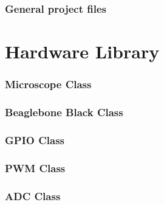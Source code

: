 \documentclass[11pt,fleqn,,a4paper,twoside,openright]{book}
\begin{document}
\subsection*{General project files}









\chapter{Hardware Library}
\subsection*{Microscope Class}


\newpage
\subsection*{Beaglebone Black Class}


\newpage
\subsection*{GPIO Class}


\newpage
\subsection*{PWM Class}


\newpage
\subsection*{ADC Class}


\newpage
\end{document}
